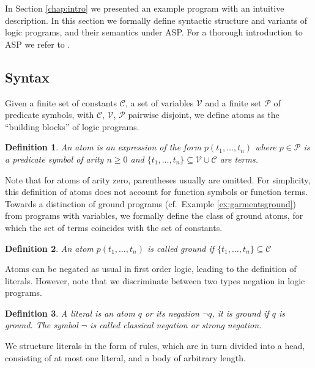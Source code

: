 \documentclass{vutinfth} %
\newtheorem{definition}{Definition}[chapter]
\begin{document}
In Section \ref{chap:intro} we presented an example program with an intuitive description. In this section we formally define syntactic structure and variants of logic programs, and their semantics under ASP. For a thorough introduction to ASP we refer to \cite{DBLP:conf/rweb/EiterIK09}.

\subsection{Syntax}


Given a finite set of constants $\mathcal{C}$, a set of variables $\mathcal{V}$ and a finite set $\mathcal{P}$ of predicate symbols, with $\mathcal{C}$, $\mathcal{V}$, $\mathcal{P}$ pairwise disjoint, we define atoms as the \enquote{building blocks} of logic programs.

\begin{definition}
An \emph{atom} is an expression of the form $p(t_1, \ldots , t_n)$ where $p \in \mathcal{P}$ is a predicate symbol of arity $n \geq 0$ and $\{ t_1, \ldots , t_n \} \subseteq \mathcal{V} \cup \mathcal{C}$ are terms.
\end{definition}

Note that for atoms of arity zero, parentheses usually are omitted. For simplicity, this definition of atoms does not account for function symbols or function terms. Towards a distinction of ground programs (cf.~Example \ref{ex:garmentsground}) from programs with variables, we formally define the class of ground atoms, for which the set of terms coincides with the set of constants.

\begin{definition}
An atom $p(t_1, \ldots , t_n)$ is called \emph{ground} if $\{ t_1, \ldots , t_n \} \subseteq \mathcal{C}$
\end{definition}

Atoms can be negated as usual in first order logic, leading to the definition of literals. However, note that we discriminate between two types negation in logic programs.

\begin{definition}
\label{def:lit}
A \emph{literal} is an atom $q$ or its negation $\neg q$, it is \emph{ground} if $q$ is ground. The symbol $\neg$ is called \emph{classical negation} or \emph{strong negation}.
\end{definition}

We structure literals in the form of rules, which are in turn divided into a head, consisting of at most one literal, and a body of arbitrary length.
\end{document}
